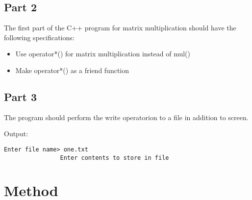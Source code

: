 \documentclass{article}
\begin{document}
		\subsection{Part 2}
			The first part of the C++ program for matrix multiplication should have the following specifications:
			\begin{itemize}
				\item Use operator*() for matrix multiplication instead of mul()
				\item Make operator*() as a friend function
			\end{itemize}
		
		\subsection{Part 3}
			The program should perform the write operatorion to a file in addition to screen.
			
			Output:
			\begin{lstlisting}[style=console]
				Enter file name> one.txt
				Enter contents to store in file
			\end{lstlisting}
			
	
	
	\section{Method}
\end{document}
